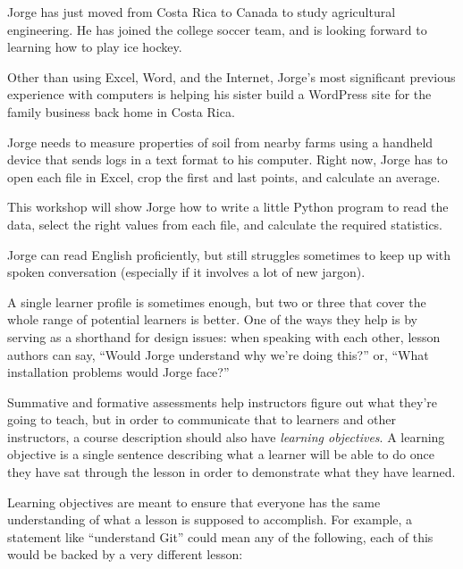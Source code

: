\begin{genumerate}

\item
  Jorge has just moved from Costa Rica to Canada to study agricultural
  engineering.  He has joined the college soccer team, and is looking
  forward to learning how to play ice hockey.

\item
  Other than using Excel, Word, and the Internet, Jorge's most
  significant previous experience with computers is helping his sister
  build a WordPress site for the family business back home in Costa
  Rica.

\item
  Jorge needs to measure properties of soil from nearby farms using a
  handheld device that sends logs in a text format to his computer.
  Right now, Jorge has to open each file in Excel, crop the first and
  last points, and calculate an average.

\item
  This workshop will show Jorge how to write a little Python program
  to read the data, select the right values from each file, and
  calculate the required statistics.

\item
  Jorge can read English proficiently, but still struggles sometimes
  to keep up with spoken conversation (especially if it involves a lot
  of new jargon).

\end{genumerate}

A single learner profile is sometimes enough, but two or three that
cover the whole range of potential learners is better.  One of the
ways they help is by serving as a shorthand for design issues: when
speaking with each other, lesson authors can say, ``Would Jorge
understand why we're doing this?'' or, ``What installation problems
would Jorge face?''


Summative and formative assessments help instructors figure out what
they're going to teach, but in order to communicate that to learners
and other instructors, a course description should also
have \emph{learning objectives}. A learning objective is a single
sentence describing what a learner will be able to do once they have
sat through the lesson in order to demonstrate what they have learned.

Learning objectives are meant to ensure that everyone has the same
understanding of what a lesson is supposed to accomplish. For example,
a statement like ``understand Git'' could mean any of the following,
each of this would be backed by a very different lesson:

